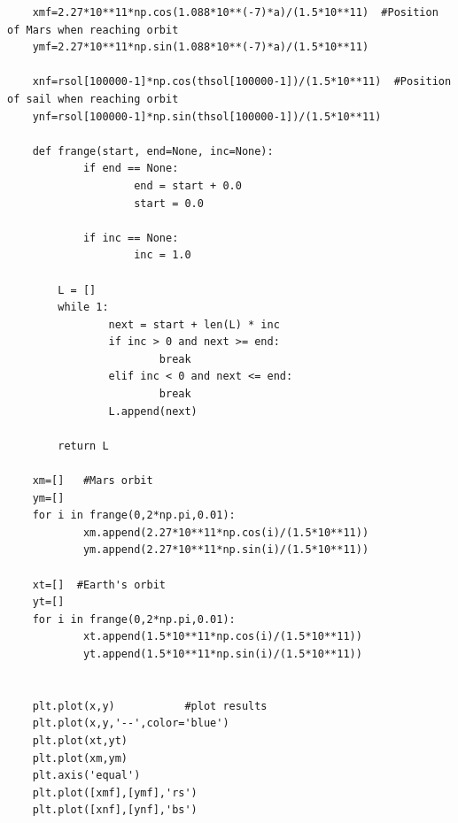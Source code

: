 \documentclass[twocolumn,12pt,a4paper]{article}
\numberwithin{equation}{section}
\begin{document}
\begin{verbatim}
	xmf=2.27*10**11*np.cos(1.088*10**(-7)*a)/(1.5*10**11)  #Position of Mars when reaching orbit
	ymf=2.27*10**11*np.sin(1.088*10**(-7)*a)/(1.5*10**11)
	
	xnf=rsol[100000-1]*np.cos(thsol[100000-1])/(1.5*10**11)  #Position of sail when reaching orbit
	ynf=rsol[100000-1]*np.sin(thsol[100000-1])/(1.5*10**11)
	
	def frange(start, end=None, inc=None):
			if end == None:
					end = start + 0.0
					start = 0.0
	
			if inc == None:
					inc = 1.0
	
		L = []
		while 1:
				next = start + len(L) * inc
				if inc > 0 and next >= end:
						break
				elif inc < 0 and next <= end:
						break
				L.append(next)
	
		return L
	
	xm=[]   #Mars orbit
	ym=[]
	for i in frange(0,2*np.pi,0.01):
			xm.append(2.27*10**11*np.cos(i)/(1.5*10**11))
			ym.append(2.27*10**11*np.sin(i)/(1.5*10**11))
	
	xt=[]  #Earth's orbit
	yt=[]
	for i in frange(0,2*np.pi,0.01):
			xt.append(1.5*10**11*np.cos(i)/(1.5*10**11))
			yt.append(1.5*10**11*np.sin(i)/(1.5*10**11))
	
	
	plt.plot(x,y)			#plot results
	plt.plot(x,y,'--',color='blue')
	plt.plot(xt,yt)
	plt.plot(xm,ym)
	plt.axis('equal')
	plt.plot([xmf],[ymf],'rs')
	plt.plot([xnf],[ynf],'bs')

	
\end{verbatim}
\end{document}
